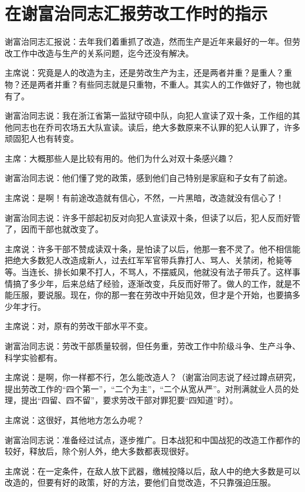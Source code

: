 \section[在谢富治同志汇报劳改工作时的指示（一九六四年四月二十八日）]{在谢富治同志汇报劳改工作时的指示}


谢富治同志汇报说：去年我们着重抓了改造，然而生产是近年来最好的一年。但劳改工作中改造与生产的关系问题，迄今还没有解决。

主席说：究竟是人的改造为主，还是劳改生产为主，还是两者并重？是重人？重物？还是两者并重？有些同志就是只重物，不重人。其实人的工作做好了，物也就有了。

谢富治同志说：我在浙江省第一监狱守硕中队，向犯人宣读了双十条，工作组的其他同志也在乔司农场五大队宣读。读后，绝大多数原来不认罪的犯人认罪了，许多顽固犯人也有转变。

主席：大概那些人是比较有用的。他们为什么对双十条感兴趣？

谢富治同志说：他们懂了党的政策，感到他们自己特别是家庭和子女有了前途。

主席说：是啊！有前途改造就有信心，不然，一片黑暗，改造就没有信心了！

谢富治同志说：许多干部起初反对向犯人宣读双十条，但读了以后，犯人反而好管了，因而干部也就改变了。

主席说：许多干部不赞成读双十条，是怕读了以后，他那一套不灵了。他不相信能把绝大多数犯人改造成新人，过去红军军官带兵靠打人、骂人、关禁闭，枪毙等等。当连长、排长如果不打人，不骂人，不摆威风，他就没有法子带兵了。这样事情搞了多少年，后来总结了经验，逐渐改变，兵反而好带了。做人的工作，就是不能压服，要说服。现在，你的那一套在劳改中开始见效，但才是个开始，也要搞多少年才行。

主席说：对，原有的劳改干部水平不变。

谢富治同志说：劳改干部质量较弱，但任务重，劳改工作中阶级斗争、生产斗争、科学实验都有。

主席说：是啊，你一样都不行，怎么能改造人？（谢富治同志说了经过蹲点研究，提出劳改工作的“四个第一”，“二个为主”，“二个从宽从严”。对刑满就业人员的处理，提出“四留、四不留”，要求劳改干部对罪犯要“四知道”时）。

主席说：这很好，其他地方怎么办呢？

谢富治同志说：准备经过试点，逐步推广。日本战犯和中国战犯的改造工作都作的较好，释放后，除个别人外，绝大多数都表现很好。

主席说：在一定条件，在敌人放下武器，缴械投降以后，敌人中的绝大多数是可以改造的，但要有好的政策，好的方法，要他们自觉改造，不只靠强迫压服。


